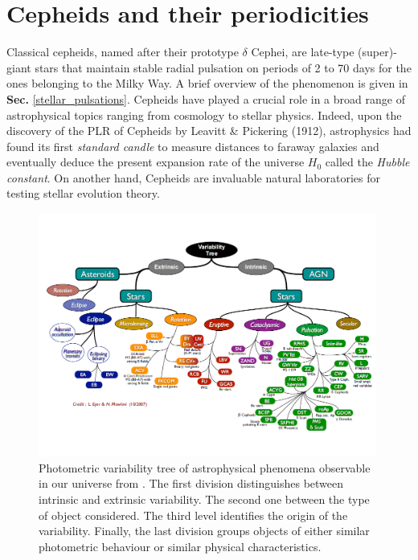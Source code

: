             \section{Cepheids and their periodicities}
            \label{cepheids_intro}
            Classical cepheids, named after their prototype $\delta$ Cephei, are late-type (super)-giant stars that maintain stable radial pulsation on periods of 2 to 70 days for the ones belonging to the Milky Way\parencite{Eyer2007VariableDiagram}. A brief overview of the phenomenon is given in \textbf{Sec.} \ref{stellar_pulsations}. Cepheids have played a crucial role in a broad range of astrophysical topics ranging from cosmology to stellar physics. Indeed, upon the discovery of the \ac{PLR} of Cepheids by Leavitt \& Pickering (1912), astrophysics had found its first \textit{standard candle} to measure distances to faraway galaxies and eventually deduce the present expansion rate of the universe $H_0$ called the \textit{Hubble constant}. On another hand, Cepheids are invaluable natural laboratories for testing stellar evolution theory.
            
    
            \begin{figure}[H]
            \centering
            \includegraphics[width=0.99\textwidth]{report/images/variability_tree.png}
            \caption{Photometric variability tree of astrophysical phenomena observable in our universe from \cite{Eyer2007VariableDiagram}. The first division distinguishes between intrinsic and extrinsic variability. The second one between the type of object considered. The third level identifies the origin of the variability. Finally, the last division groups objects of either similar photometric behaviour or similar physical characteristics.}
            \label{1a}
            \end{figure}

